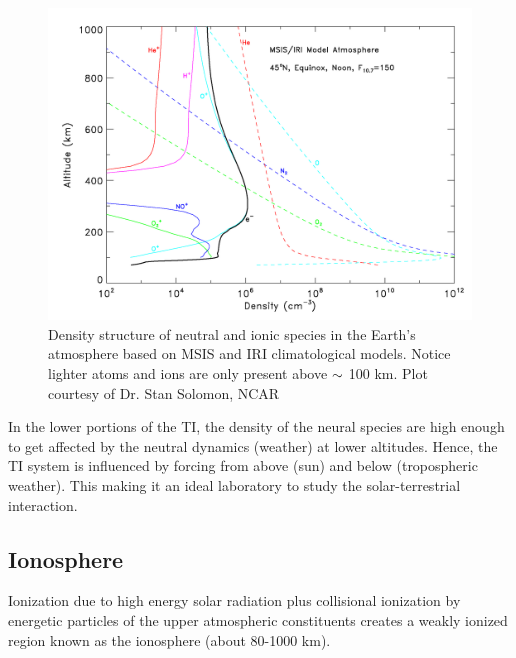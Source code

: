 \begin{figure}[t]
	\centering\includegraphics[width=35pc]{thm_dens.png}
	\caption{Density structure of neutral and ionic species in the Earth's atmosphere based on MSIS and IRI climatological models. Notice lighter atoms and ions are only present above $\rm \sim$ 100 km. Plot courtesy of Dr. Stan Solomon, NCAR }
	\label{fig:TI_dens}
\end{figure}
In the lower portions of the TI, the density of the neural species are high enough to get affected by the neutral dynamics (weather) at lower altitudes. Hence, the TI system is influenced by forcing from above (sun) and below (tropospheric weather). This making it an ideal laboratory to study the solar-terrestrial interaction.
\subsection{Ionosphere}
Ionization due to high energy solar radiation plus collisional ionization by energetic particles of the upper atmospheric constituents creates a weakly ionized region known as the ionosphere (about 80-1000 km).

